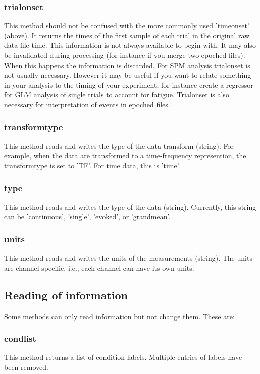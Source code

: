 \subsubsection{trialonset}
This method should not be confused with the more commonly used 'timeonset' (above). 
It returns the times of the first sample of each trial in the original raw data
file time. This information is not always available to begin with. It may also be invalidated
during processing (for instance if you merge two epoched files). When this happens
the information is discarded. For SPM analysis trialonset is not usually necessary.
However it may be useful if you want to relate something in your analysis to the timing
of your experiment, for instance create a regressor for GLM analysis of single trials 
to account for fatigue. Trialonset is also necessary for interpretation of events in epoched
files.


\subsubsection{transformtype}
This method reads and writes the type of the data transform
(string). For example, when the data are transformed to a
time-frequency represention, the transformtype is set to 'TF'. For
time data, this is 'time'.

\subsubsection{type}
This method reads and writes the type of the data (string). Currently,
this string can be 'continuous', 'single', 'evoked', or 'grandmean'.

\subsubsection{units}
This method reads and writes the units of the measurements
(string). The units are channel-specific, i.e., each channel can have
its own units.


\subsection{Reading of information}
Some methods can only read information but not change them. These are:

\subsubsection{condlist}
This method returns a list of condition labels. Multiple entries of
labels have been removed.

